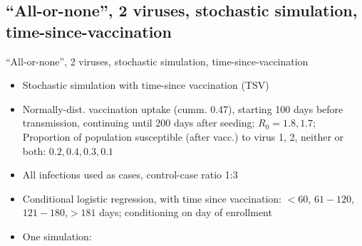 \documentclass{beamer}
\begin{document}
\subsection{``All-or-none'', 2 viruses, stochastic simulation, time-since-vaccination}
\begin{frame}{``All-or-none'', 2 viruses, stochastic simulation, time-since-vaccination}

{\footnotesize 
\begin{itemize}
	\item Stochastic simulation with time-since vaccination (TSV)
\item Normally-dist. vaccination uptake (cumm. 0.47), starting 100 days before transmission, continuing until 200 days after seeding; $R_0=1.8,1.7$; Proportion of population susceptible (after vacc.) to virus 1, 2, neither or both: $0.2,0.4,0.3,0.1$
\item All infections used as cases, control-case ratio 1:3
\item Conditional logistic regression, with time since vaccination: $< 60$, $61-120$,$121-180$,$>181$ days; conditioning on day of enrollment
\item <2-> One simulation:
\end{itemize} 
}
%
\centering
{}
\end{frame}
%
\end{document}
